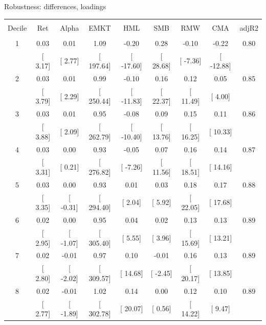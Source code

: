 \documentclass{beamer}
\begin{document}
\begin{frame}{Robustness: differences, loadings}

\vspace{-0.64cm}

\begin{table}[!htbp] \centering 
  \scriptsize
\begin{tabular}{@{\extracolsep{0pt}} ccccccccc} 
\\[-1.8ex]\hline 
\hline \\[-1.8ex] 
Decile & Ret & Alpha & EMKT & HML & SMB & RMW & CMA & adjR2 \\ 
\hline \\[-1.8ex] 
1 & 0.03 & 0.01 & 1.09 & -0.20 & 0.28 & -0.10 & -0.22 & 0.80 \\ 
 & [ 3.17] & [ 2.77] & [ 197.64] & [ -17.60] & [ 28.68] & [ -7.36] & [ -12.88] &  \\ 
2 & 0.03 & 0.01 & 0.99 & -0.10 & 0.16 & 0.12 & 0.05 & 0.85 \\ 
 & [ 3.79] & [ 2.29] & [ 250.44] & [ -11.83] & [ 22.37] & [ 11.49] & [ 4.00] &  \\ 
3 & 0.03 & 0.01 & 0.95 & -0.08 & 0.09 & 0.15 & 0.11 & 0.86 \\ 
 & [ 3.88] & [ 2.09] & [ 262.79] & [ -10.40] & [ 13.76] & [ 16.25] & [ 10.33] &  \\ 
4 & 0.03 & 0.00 & 0.93 & -0.05 & 0.07 & 0.16 & 0.14 & 0.87 \\ 
 & [ 3.31] & [ 0.21] & [ 276.82] & [ -7.26] & [ 11.56] & [ 18.51] & [ 14.16] &  \\ 
5 & 0.03 & 0.00 & 0.93 & 0.01 & 0.03 & 0.18 & 0.17 & 0.88 \\ 
 & [ 3.35] & [ -0.31] & [ 294.40] & [ 2.04] & [ 5.92] & [ 22.05] & [ 17.68] &  \\ 
6 & 0.02 & 0.00 & 0.95 & 0.04 & 0.02 & 0.13 & 0.13 & 0.89 \\ 
 & [ 2.95] & [ -1.07] & [ 305.40] & [ 5.55] & [ 3.96] & [ 15.69] & [ 13.21] &  \\ 
7 & 0.02 & -0.01 & 0.97 & 0.10 & -0.01 & 0.16 & 0.13 & 0.89 \\ 
 & [ 2.80] & [ -2.02] & [ 309.57] & [ 14.68] & [ -2.45] & [ 20.17] & [ 13.85] &  \\ 
8 & 0.02 & -0.01 & 1.02 & 0.14 & 0.00 & 0.12 & 0.10 & 0.89 \\ 
 & [ 2.77] & [ -1.89] & [ 302.78] & [ 20.07] & [ 0.56] & [ 14.22] & [ 9.47] &  \\ 

\end{tabular}
\end{table}
\end{frame}
\end{document}
